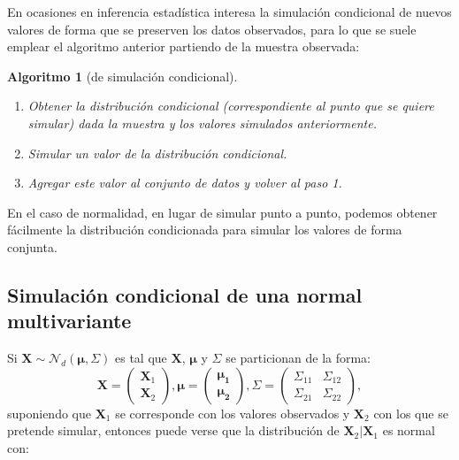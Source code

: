 \documentclass[
  spanish,
  10pt,
]{book}
\renewcommand{\boldsymbol}[1]{\symbf{#1}}
\renewcommand{\mathbf}[1]{\symbf{#1}}
\theoremstyle{break}
\newtheorem{conjecture}{Algoritmo}[chapter]
\theoremstyle{nonumberplain}
\begin{document}
En ocasiones en inferencia estadística interesa la simulación condicional de nuevos valores de forma que se preserven los datos observados, para lo que se suele emplear el algoritmo anterior partiendo de la muestra observada:

\begin{conjecture}[de simulación condicional]
\protect\hypertarget{cnj:cond-incond}{}\label{cnj:cond-incond}

\begin{enumerate}
\def\labelenumi{\arabic{enumi}.}
\item
  Obtener la distribución condicional (correspondiente al punto
  que se quiere simular) dada la muestra y los valores simulados
  anteriormente.
\item
  Simular un valor de la distribución condicional.
\item
  Agregar este valor al conjunto de datos y volver al paso 1.
\end{enumerate}

\end{conjecture}

En el caso de normalidad, en lugar de simular punto a punto,
podemos obtener fácilmente la distribución condicionada
para simular los valores de forma conjunta.

\subsection{Simulación condicional de una normal multivariante}\label{condnormal}

Si \(\mathbf{X} \sim \mathcal{N}_d\left( \boldsymbol{\mu},\Sigma \right)\) es tal que \(\mathbf{X}\), \(\boldsymbol{\mu}\) y \(\Sigma\) se particionan de la forma:
\[\mathbf{X} =
\begin{pmatrix}
 \mathbf{X}_1 \\
 \mathbf{X}_2
\end{pmatrix},  
\boldsymbol{\mu} =
\begin{pmatrix}
 \boldsymbol{\mu_1} \\
 \boldsymbol{\mu_2}
\end{pmatrix}, 
\Sigma =
\begin{pmatrix}
 \Sigma_{11} & \Sigma_{12} \\
 \Sigma_{21} & \Sigma_{22}
\end{pmatrix},\]
suponiendo que \(\mathbf{X}_1\) se corresponde con los valores observados y \(\mathbf{X}_2\) con los que se pretende simular,
entonces puede verse \citep[e.g.][]{ripley1987stochastic} que la distribución de \(\mathbf{X}_2 | \mathbf{X}_1\) es normal con:
\end{document}
